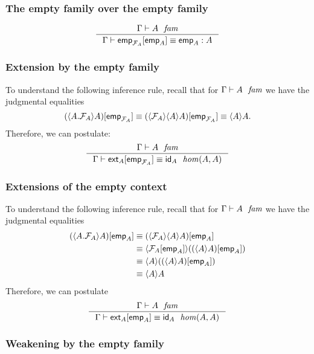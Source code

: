 \subsubsection{The empty family over the empty family}
\begin{equation*}
\inference
  {\jfam{\Gamma}{A}}
  {\jtermeq{\Gamma}{A}{\subst{\tfemp{A}}{\tfemp{\mfam{A}}}}{\tfemp{A}}}
\end{equation*}

\subsubsection{Extension by the empty family}
To understand the following inference rule, recall that for $\jfam{\Gamma}{A}$
we have the judgmental equalities
\begin{equation*}
\subst{\tfemp{\mfam{A}}}{\ctxwk{\ctxext{A}{\mfam{A}}}{A}}\jdeq
\subst{\tfemp{\mfam{A}}}{\ctxwk{\mfam{A}}{{A}{A}}}\jdeq
\ctxwk{A}{A}.
\end{equation*}
Therefore, we can postulate:
\begin{equation*}
\inference
  {\jfam{\Gamma}{A}}
  {\jhomeq{\Gamma}{A}{A}{\subst{\tfemp{\mfam{A}}}{\tfext{A}}}{\idfunc[A]}}
\end{equation*}

\subsubsection{Extensions of the empty context}
To understand the following inference rule, recall that for $\jfam{\Gamma}{A}$
we have the judgmental equalities
\begin{align*}
\subst{\tfemp{A}}{\ctxwk{\ctxext{A}{\mfam{A}}}{A}}
& \jdeq \subst{\tfemp{A}}{\ctxwk{\mfam{A}}{{A}{A}}}\\
& \jdeq \ctxwk{\subst{\tfemp{A}}{\mfam{A}}}{\subst{\tfemp{A}}{\ctxwk{A}{A}}}\\
& \jdeq \ctxwk{A}{\subst{\tfemp{A}}{\ctxwk{A}{A}}}\\
& \jdeq \ctxwk{A}{A}
\end{align*}
Therefore, we can postulate
\begin{equation*}
\inference
  {\jfam{\Gamma}{A}}
  {\jhomeq{\Gamma}{A}{A}{\subst{\tfemp{A}}{\tfext{A}}}{\idfunc[A]}}
\end{equation*}

\subsubsection{Weakening by the empty family}

